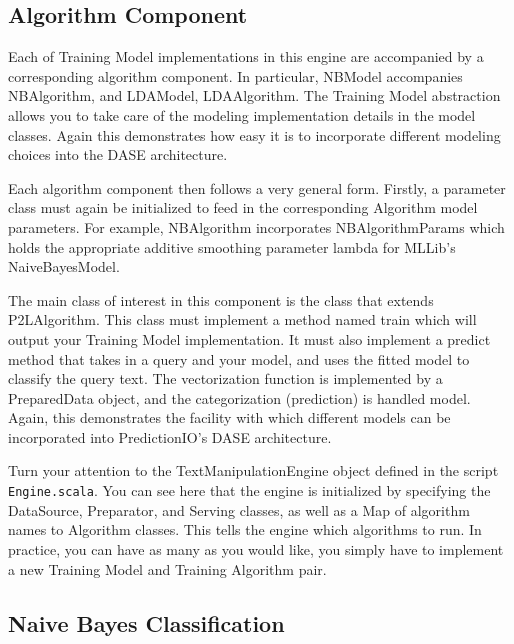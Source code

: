 \documentclass[a4paper,12pt]{article}
\renewcommand{\tt}[1]{\texttt{#1}}
\newcommand{\3}{\left}
\newcommand{\4}{\right}
\renewcommand{\-}[1]{{}^{-#1}}
\begin{document}
\subsection*{Algorithm Component}

Each of Training Model implementations in this engine are accompanied by a corresponding algorithm component. In particular, NBModel accompanies NBAlgorithm, and LDAModel, LDAAlgorithm. The Training Model abstraction allows you to take care of the modeling implementation details in the model classes. Again this demonstrates how easy it is to incorporate different modeling choices into the DASE architecture. 

Each algorithm component then follows a very general form. Firstly, a parameter class must again be initialized to feed in the corresponding Algorithm model parameters. For example, NBAlgorithm incorporates NBAlgorithmParams which holds the appropriate additive smoothing parameter lambda for MLLib's NaiveBayesModel. 

The main class of interest in this component is the class that extends P2LAlgorithm.
 This class must implement a method named train which will output your Training Model implementation. It must also implement a predict method that takes in a query and your model, and uses the fitted model to classify the query text. The vectorization function is implemented by a PreparedData object, and the categorization (prediction) is handled model. Again, this demonstrates the facility with which different models can be incorporated into PredictionIO's DASE architecture.
 
Turn your attention to the TextManipulationEngine object defined in the script \tt{Engine.scala}. You can see here that the engine is initialized by specifying the DataSource, Preparator, and Serving classes, as well as a Map of algorithm names to Algorithm classes. This tells the engine which algorithms to run. In practice, you can have as many as you would like, you simply have to implement a new Training Model and Training Algorithm pair. 


\subsection*{Naive Bayes Classification}
\end{document}
